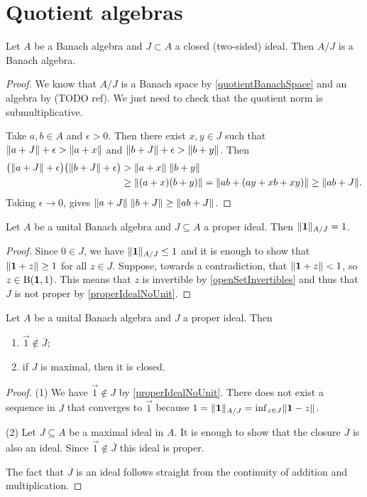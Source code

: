 \section{Quotient algebras}
\begin{proposition}
Let $A$ be a Banach algebra and $J\subset A$ a closed (two-sided) ideal. Then $A/J$ is a Banach algebra.
\end{proposition}
\begin{proof}
We know that $A/J$ is a Banach space by \ref{quotientBanachSpace} and an algebra by (TODO ref). We just need to check that the quotient norm is submultiplicative.

Take $a,b\in A$ and $\epsilon>0$. Then there exist $x,y\in J$ such that $\lVert a+J\rVert + \epsilon > \lVert a+x\rVert$ and $\lVert b+J\rVert + \epsilon > \lVert b+y\rVert$. Then
\begin{align*}
\big(\lVert a+J\rVert + \epsilon\big)\big(\lVert b+J\rVert + \epsilon\big) &> \lVert a+x\rVert\;\lVert b+y\rVert \\
&\geq \lVert(a+x)(b+y)\rVert = \lVert ab + (ay+xb+xy)\rVert \geq \lVert ab + J\rVert.
\end{align*}
Taking $\epsilon\to 0$, gives $\lVert a+J\rVert\;\lVert b+J\rVert \geq \lVert ab + J\rVert$.
\end{proof}

\begin{proposition}
Let $A$ be a unital Banach algebra and $J\subseteq A$ a proper ideal. Then $\lVert\boldsymbol{\mathrm{1}}\rVert_{A/J} = 1$.
\end{proposition}
\begin{proof}
Since $0\in J$, we have $\lVert\boldsymbol{\mathrm{1}}\rVert_{A/J} \leq 1$ and it is enough to show that $\lVert\boldsymbol{\mathrm{1}}+z\rVert \geq 1$ for all $z\in J$. Suppose, towards a contradiction, that $\lVert\boldsymbol{\mathrm{1}}+z\rVert < 1$, so $z\in \operatorname{B}(\boldsymbol{\mathrm{1}},1)$. This means that $z$ is invertible by \ref{openSetInvertibles} and thus that $J$ is not proper by \ref{properIdealNoUnit}.
\end{proof}
\begin{corollary}
Let $A$ be a unital Banach algebra and $J$ a proper ideal. Then
\begin{enumerate}
\item $\vec{1} \notin \overline{J}$;
\item if $J$ is maximal, then it is closed.
\end{enumerate}
\end{corollary}
\begin{proof}
(1) We have $\vec{1}\notin J$ by \ref{properIdealNoUnit}. There does not exist a sequence in $J$ that converges to $\vec{1}$ because $1 = \lVert\boldsymbol{\mathrm{1}}\rVert_{A/J} = \inf_{z\in J}\lVert\boldsymbol{\mathrm{1}}-z\rVert$.

(2) Let $J\subseteq A$ be a maximal ideal in $A$. It is enough to show that the closure $\overline{J}$ is also an ideal. Since $\vec{1}\notin \overline{J}$ this ideal is proper.

The fact that $\overline{J}$ is an ideal follows straight from the continuity of addition and multiplication.
\end{proof}


